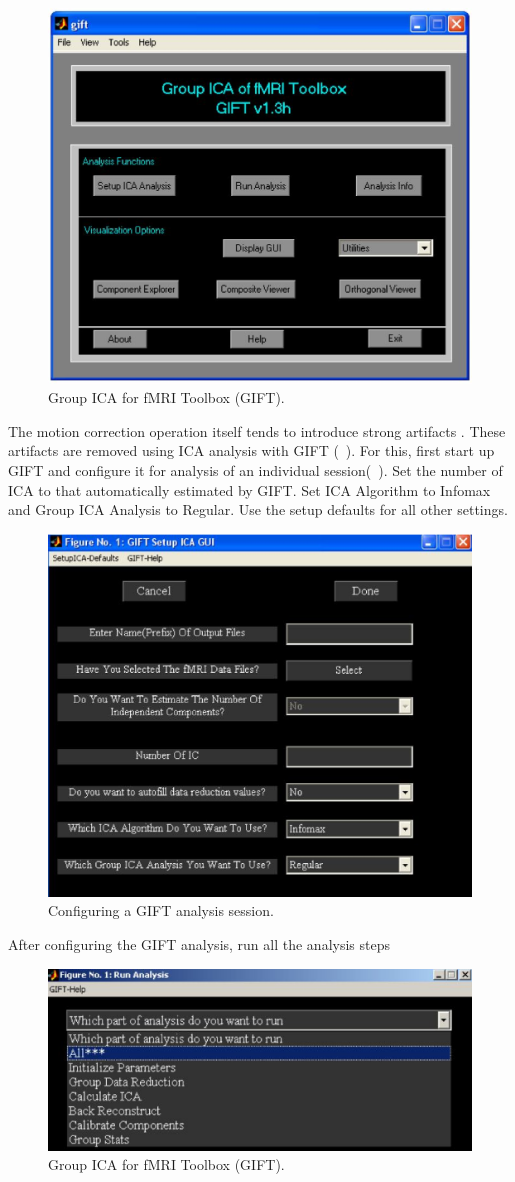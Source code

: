 \begin{figure}
    \begin{center}
   \includegraphics[width=.5\linewidth]{figures/gift}
    \caption[Group ICA for fMRI Toolbox (GIFT)]
    {Group ICA for fMRI Toolbox (GIFT).
     \label{fig:gift}}
    \end{center}
\end{figure}
The motion correction operation itself tends to introduce strong
artifacts \citet{Grootoonk2000}. These artifacts are removed using
ICA analysis with GIFT (\cf~). For this, first start
up GIFT and configure it for analysis of an individual
session(\cf~). Set the number of ICA to that
automatically estimated by GIFT. Set ICA Algorithm to Infomax and
Group ICA Analysis to Regular. Use the setup defaults for all other
settings.

\begin{figure}
    \begin{center}
   \includegraphics[width=.5\linewidth]{figures/gift-ica-setup}
    \caption[Configuring a GIFT analysis session.]
    {Configuring a GIFT analysis session.
     \label{fig:gift-setup}}
    \end{center}
\end{figure}

After configuring the GIFT analysis, run all the analysis steps
\begin{figure}
    \begin{center}
   \includegraphics[width=.5\linewidth]{figures/gift-run}
    \caption[Group ICA for fMRI Toolbox (GIFT).]{Group ICA for fMRI Toolbox (GIFT).
     \label{fig:gift-setup}}
    \end{center}
\end{figure}


